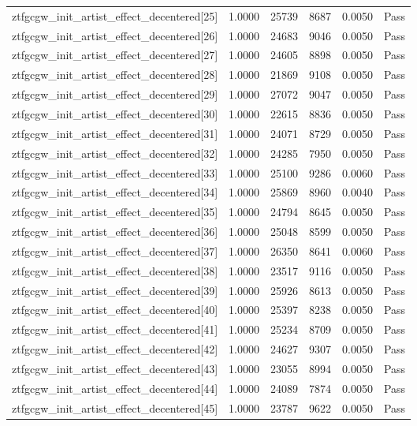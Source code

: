 \begin{table}[htbp]
\begin{tabular}{llrrll}
ztfgcgw\_init\_artist\_effect\_decentered[25] & 1.0000 & 25739 & 8687 & 0.0050 & Pass \\
ztfgcgw\_init\_artist\_effect\_decentered[26] & 1.0000 & 24683 & 9046 & 0.0050 & Pass \\
ztfgcgw\_init\_artist\_effect\_decentered[27] & 1.0000 & 24605 & 8898 & 0.0050 & Pass \\
ztfgcgw\_init\_artist\_effect\_decentered[28] & 1.0000 & 21869 & 9108 & 0.0050 & Pass \\
ztfgcgw\_init\_artist\_effect\_decentered[29] & 1.0000 & 27072 & 9047 & 0.0050 & Pass \\
ztfgcgw\_init\_artist\_effect\_decentered[30] & 1.0000 & 22615 & 8836 & 0.0050 & Pass \\
ztfgcgw\_init\_artist\_effect\_decentered[31] & 1.0000 & 24071 & 8729 & 0.0050 & Pass \\
ztfgcgw\_init\_artist\_effect\_decentered[32] & 1.0000 & 24285 & 7950 & 0.0050 & Pass \\
ztfgcgw\_init\_artist\_effect\_decentered[33] & 1.0000 & 25100 & 9286 & 0.0060 & Pass \\
ztfgcgw\_init\_artist\_effect\_decentered[34] & 1.0000 & 25869 & 8960 & 0.0040 & Pass \\
ztfgcgw\_init\_artist\_effect\_decentered[35] & 1.0000 & 24794 & 8645 & 0.0050 & Pass \\
ztfgcgw\_init\_artist\_effect\_decentered[36] & 1.0000 & 25048 & 8599 & 0.0050 & Pass \\
ztfgcgw\_init\_artist\_effect\_decentered[37] & 1.0000 & 26350 & 8641 & 0.0060 & Pass \\
ztfgcgw\_init\_artist\_effect\_decentered[38] & 1.0000 & 23517 & 9116 & 0.0050 & Pass \\
ztfgcgw\_init\_artist\_effect\_decentered[39] & 1.0000 & 25926 & 8613 & 0.0050 & Pass \\
ztfgcgw\_init\_artist\_effect\_decentered[40] & 1.0000 & 25397 & 8238 & 0.0050 & Pass \\
ztfgcgw\_init\_artist\_effect\_decentered[41] & 1.0000 & 25234 & 8709 & 0.0050 & Pass \\
ztfgcgw\_init\_artist\_effect\_decentered[42] & 1.0000 & 24627 & 9307 & 0.0050 & Pass \\
ztfgcgw\_init\_artist\_effect\_decentered[43] & 1.0000 & 23055 & 8994 & 0.0050 & Pass \\
ztfgcgw\_init\_artist\_effect\_decentered[44] & 1.0000 & 24089 & 7874 & 0.0050 & Pass \\
ztfgcgw\_init\_artist\_effect\_decentered[45] & 1.0000 & 23787 & 9622 & 0.0050 & Pass \\

\end{tabular}
\end{table}
